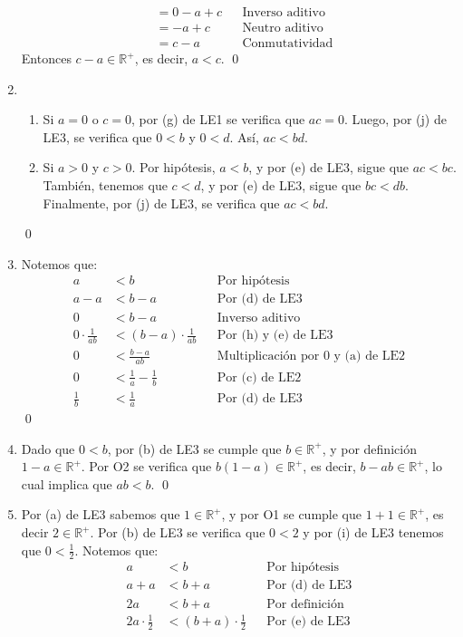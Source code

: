 \documentclass[11pt]{article}
\newcommand{\R}{\mathbb{R}}
\begin{document}
\begin{enumerate}[label=\alph*)]
\begin{align*}
        &= 0 - a +c && \text{Inverso aditivo}\\
        &= -a +c && \text{Neutro aditivo}\\
        &= c-a && \text{Conmutatividad}
    \end{align*} Entonces $c-a \in \R^+$, es decir, $a<c$. \qed
\item 
\begin{enumerate}[label=\roman*)]
    \item Si $a=0$ o $c=0$, por (g) de LE1 se verifica que $ac=0$. Luego, por (j) de LE3, se verifica que $0<b$ y $0<d$. Así, $ac<bd$.
    \item Si $a>0$ y $c>0$. Por hipótesis, $a<b$, y por (e) de LE3, sigue que $ac<bc$. También, tenemos que $c<d$, y por (e) de LE3, sigue que $bc<db$. Finalmente, por (j) de LE3, se verifica que $ac<bd$.
\end{enumerate} \qed
    \item Notemos que:
    \begin{align*}
    a &< b && \text{Por hipótesis} \\
    a-a &< b-a && \text{Por (d) de LE3} \\
    0 &< b-a && \text{Inverso aditivo} \\
    0 \cdot \frac{1}{ab} &< (b-a) \cdot \frac{1}{ab} && \text{Por (h) y (e) de LE3}\\
    0 &< \frac{b-a}{ab} && \text{Multiplicación por $0$ y (a) de LE2}\\
    0 &< \frac{1}{a} - \frac{1}{b} && \text{Por (c) de LE2}\\
    \frac{1}{b} &< \frac{1}{a} && \text{Por (d) de LE3}
    \end{align*} \qed
\item Dado que $0<b$, por (b) de LE3 se cumple que $b \in \R^+$, y por definición $1-a \in \R^+$. Por O2 se verifica que $b(1-a) \in \R^+$, es decir, $b-ab \in \R^+$, lo cual implica que $ab<b$. \qed
    \item Por (a) de LE3 sabemos que $1 \in \R^+$, y por O1 se cumple que $1+1 \in \R^+$, es decir $2 \in \R^+$. Por (b) de LE3 se verifica que $0<2$ y por (i) de LE3 tenemos que $0<\frac{1}{2}$. Notemos que: \begin{align*}
        a &< b && \text{Por hipótesis} \\
        a + a &< b+a && \text{Por (d) de LE3} \\
        2a &< b+a && \text{Por definición} \\
        2a \cdot \frac{1}{2} &< (b+a) \cdot \frac{1}{2} && \text{Por (e) de LE3} \\

\end{align*}
\end{enumerate}
\end{document}
